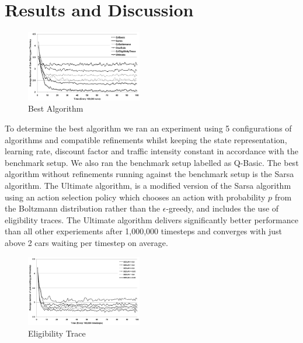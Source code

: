\section{Results and Discussion}

\begin{description}

\begin{figure}
\centering
\includegraphics[width=0.45\textwidth]{algorithm}
\caption{Best Algorithm}\label{f:algorithm}
\end{figure}

\item[Fig.~\ref{f:algorithm}] To determine the best algorithm we ran an
experiment using 5 configurations of algorithms and compatible refinements
whilst keeping the state representation, learning rate, discount factor and
traffic intensity constant in accordance with the benchmark setup. We also ran
the benchmark setup labelled as Q-Basic. The best algorithm without refinements
running against the benchmark setup is the Sarsa algorithm. The Ultimate
algorithm, is a modified version of the Sarsa algorithm using an action
selection policy which chooses an action with probability $p$ from the Boltzmann
distribution rather than the $\epsilon$-greedy, and includes the use of
eligibility traces. The Ultimate algorithm delivers significantly better
performance than all other experiements after 1,000,000 timesteps and converges
with just above 2 cars waiting per timestep on average.

\begin{figure}
\centering
\includegraphics[width=0.45\textwidth]{eligibility}
\caption{Eligibility Trace}\label{f:eligibility}
\end{figure}


\end{description}
